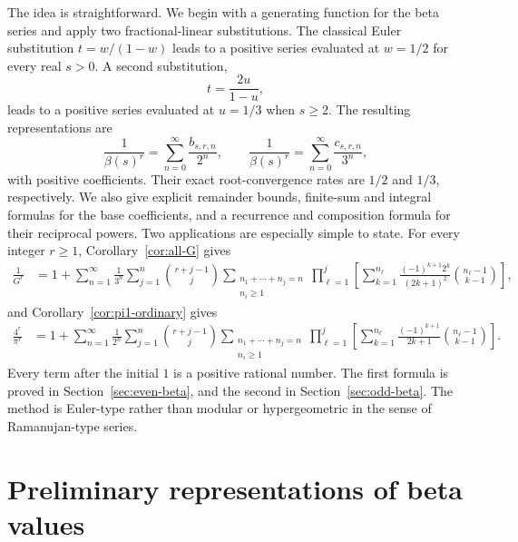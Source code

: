\documentclass[11pt,reqno]{amsart}
\numberwithin{equation}{section}
\theoremstyle{definition}
\theoremstyle{remark}
\newcommand{\Gconst}{G}
\begin{document}
The idea is straightforward.  We begin with a generating function for
the beta series and apply two fractional-linear substitutions.  The
classical Euler substitution \(t=w/(1-w)\) leads to a positive series
evaluated at \(w=1/2\) for every real \(s>0\).  A second substitution,
\begin{equation}\label{eq:transform-intro}
 t=\frac{2u}{1-u},
\end{equation}
leads to a positive series evaluated at \(u=1/3\) when \(s\geq2\).
The resulting representations are
\[
 \frac1{\beta(s)^r}
 =
 \sum_{n=0}^{\infty}\frac{b_{s,r,n}}{2^n},
 \qquad
 \frac1{\beta(s)^r}
 =
 \sum_{n=0}^{\infty}\frac{c_{s,r,n}}{3^n},
\]
with positive coefficients.  Their exact root-convergence rates are
\(1/2\) and \(1/3\), respectively.  We also give explicit remainder
bounds, finite-sum and integral formulas for the base coefficients,
and a recurrence and composition formula for their reciprocal powers.
Two applications are especially simple to state.  For every integer
\(r\geq1\), Corollary~\ref{cor:all-G} gives
\begin{equation*}
\begin{aligned}
 \frac1{\Gconst^r}
 &=1+
 \sum_{n=1}^{\infty}\frac1{3^n}
 \sum_{j=1}^{n}\binom{r+j-1}{j}
\sum_{\substack{n_1+\cdots+n_j=n\\n_i\geq1}}
 \prod_{\ell=1}^{j}
 \left[
 \sum_{k=1}^{n_\ell}
 \frac{(-1)^{k+1}2^k}{(2k+1)^2}
 \binom{n_\ell-1}{k-1}
 \right],
\end{aligned}
\end{equation*}
and Corollary~\ref{cor:pi1-ordinary} gives
\begin{equation*}
\begin{aligned}
 \frac{4^r}{\pi^r}
 &=
 1+\sum_{n=1}^{\infty}\frac1{2^n}
 \sum_{j=1}^{n}\binom{r+j-1}{j}
\sum_{\substack{n_1+\cdots+n_j=n\\n_i\geq1}}
 \prod_{\ell=1}^{j}
 \left[
 \sum_{k=1}^{n_\ell}
 \frac{(-1)^{k+1}}{2k+1}
 \binom{n_\ell-1}{k-1}
 \right].
\end{aligned}
\end{equation*}
Every term after the initial \(1\) is a positive rational number.
The first formula is proved in Section~\ref{sec:even-beta}, and the
second in Section~\ref{sec:odd-beta}.  The method is Euler-type rather
than modular or hypergeometric in the sense of Ramanujan-type series.

\section{Preliminary representations of beta values}
\label{sec:standard-dirichlet}
\end{document}
